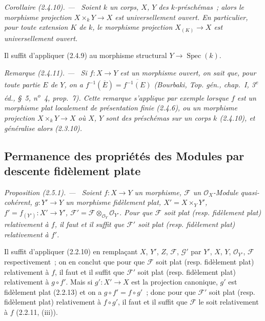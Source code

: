 \documentclass[10pt,oneside]{book}
\newenvironment{proposition}[1][]{%
  \par\medskip\noindent\itshape Proposition (#1). ---\ }{\par}
\newenvironment{corollary}[1][]{%
  \par\medskip\noindent\itshape Corollaire (#1). ---\ }{\par}
\newenvironment{remark}[1][]{%
  \par\medskip\noindent\itshape Remarque (#1). ---\ }{\par}
\begin{document}
\begin{corollary}[2.4.10]
\label{IV.2.4.10-fr}
Soient $k$ un corps, $X$, $Y$ des $k$-préschémas~; alors le morphisme
projection $X\times_k Y\to X$ est universellement ouvert. En particulier,
pour toute extension $K$ de $k$, le morphisme projection $X_{(K)}\to X$ est
universellement ouvert.
\end{corollary}

Il suffit d'appliquer (2.4.9) au morphisme structural
$Y\to\operatorname{Spec}(k)$.

\begin{remark}[2.4.11]
\label{IV.2.4.11-fr}
Si $f:X\to Y$ est un morphisme \emph{ouvert}, on sait que, pour toute partie
$E$ de $Y$, on a
$f^{-1}(\overline E)=\overline{f^{-1}(E)}$
(Bourbaki, \emph{Top. gén.}, chap.~I, 3\textsuperscript{e} éd., \S~5,
n\textsuperscript{o}~4, prop.~7). Cette remarque s'applique par exemple
lorsque $f$ est un morphisme \emph{plat localement de présentation finie}
(2.4.6), ou un morphisme projection $X\times_k Y\to X$ où $X$, $Y$ sont des
préschémas sur un corps $k$ (2.4.10), et généralise alors (2.3.10).
\end{remark}

\subsection{Permanence des propriétés des Modules par descente fidèlement plate}

\begin{proposition}[2.5.1]
\label{IV.2.5.1-fr}
Soient $f:X\to Y$ un morphisme, $\mathscr F$ un $\mathcal O_X$-Module
quasi-cohérent, $g:Y'\to Y$ un morphisme fidèlement plat,
$X'=X\times_Y Y'$, $f'=f_{(Y')}:X'\to Y'$,
$\mathscr F'=\mathscr F\otimes_{\mathcal O_Y}\mathcal O_{Y'}$. Pour que
$\mathscr F$ soit plat (resp. fidèlement plat) relativement à $f$, il faut et
il suffit que $\mathscr F'$ soit plat (resp. fidèlement plat) relativement à
$f'$.
\end{proposition}

Il suffit d'appliquer (2.2.10) en remplaçant $X$, $Y'$, $Z$, $\mathscr F$,
$\mathscr G'$ par $Y'$, $X$, $Y$, $\mathcal O_{Y'}$, $\mathscr F$
respectivement~; on en conclut que pour que $\mathscr F$ soit plat (resp.
fidèlement plat) relativement à $f$, il faut et il suffit que $\mathscr F'$
soit plat (resp. fidèlement plat) relativement à $g\circ f'$. Mais si
$g':X'\to X$ est la projection canonique, $g'$ est fidèlement plat (2.2.13)
et on a $g\circ f'=f\circ g'$~; donc pour que $\mathscr F'$ soit plat (resp.
fidèlement plat) relativement à $f\circ g'$, il faut et il suffit que
$\mathscr F$ le soit relativement à $f$ (2.2.11, (iii)).
\end{document}
